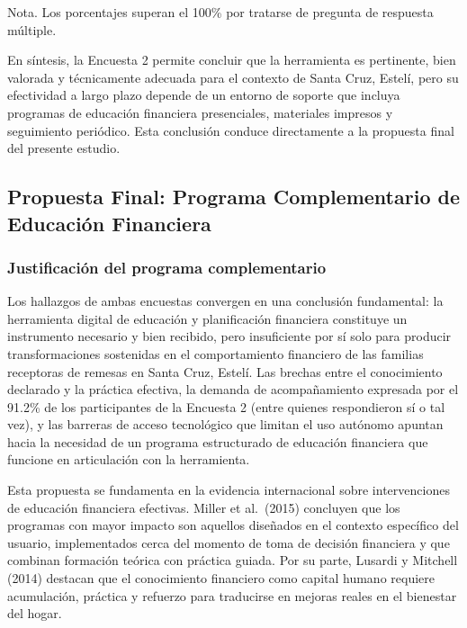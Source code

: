 \documentclass[12pt,letterpaper]{article}
\begin{document}
Nota. Los porcentajes superan el 100\% por tratarse de pregunta de respuesta múltiple.

En síntesis, la Encuesta 2 permite concluir que la herramienta es pertinente, bien valorada y técnicamente adecuada para el contexto de Santa Cruz, Estelí, pero su efectividad a largo plazo depende de un entorno de soporte que incluya programas de educación financiera presenciales, materiales impresos y seguimiento periódico. Esta conclusión conduce directamente a la propuesta final del presente estudio.

\subsection{\texorpdfstring{\textbf{Propuesta Final: Programa Complementario de Educación Financiera}}{Propuesta Final: Programa Complementario de Educación Financiera}}\label{propuesta-final-programa-complementario-de-educaciuxf3n-financiera}

\subsubsection{\texorpdfstring{\textbf{Justificación del programa complementario}}{Justificación del programa complementario}}\label{justificaciuxf3n-del-programa-complementario}

Los hallazgos de ambas encuestas convergen en una conclusión fundamental: la herramienta digital de educación y planificación financiera constituye un instrumento necesario y bien recibido, pero insuficiente por sí solo para producir transformaciones sostenidas en el comportamiento financiero de las familias receptoras de remesas en Santa Cruz, Estelí. Las brechas entre el conocimiento declarado y la práctica efectiva, la demanda de acompañamiento expresada por el 91.2\% de los participantes de la Encuesta 2 (entre quienes respondieron sí o tal vez), y las barreras de acceso tecnológico que limitan el uso autónomo apuntan hacia la necesidad de un programa estructurado de educación financiera que funcione en articulación con la herramienta.

Esta propuesta se fundamenta en la evidencia internacional sobre intervenciones de educación financiera efectivas. Miller et al.~(2015) concluyen que los programas con mayor impacto son aquellos diseñados en el contexto específico del usuario, implementados cerca del momento de toma de decisión financiera y que combinan formación teórica con práctica guiada. Por su parte, Lusardi y Mitchell (2014) destacan que el conocimiento financiero como capital humano requiere acumulación, práctica y refuerzo para traducirse en mejoras reales en el bienestar del hogar.
\end{document}
